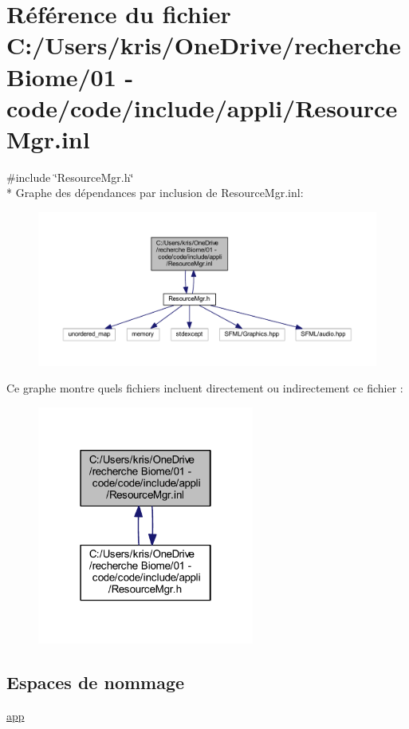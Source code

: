 \hypertarget{_resource_mgr_8inl}{}\section{Référence du fichier C\+:/\+Users/kris/\+One\+Drive/recherche Biome/01 -\/ code/code/include/appli/\+Resource\+Mgr.inl}
\label{_resource_mgr_8inl}
{\ttfamily \#include \char`\"{}Resource\+Mgr.\+h\char`\"{}}\\*
Graphe des dépendances par inclusion de Resource\+Mgr.\+inl\+:\nopagebreak
\begin{figure}[H]
\begin{center}
\leavevmode
\includegraphics[width=350pt]{_resource_mgr_8inl__incl}
\end{center}
\end{figure}
Ce graphe montre quels fichiers incluent directement ou indirectement ce fichier \+:\nopagebreak
\begin{figure}[H]
\begin{center}
\leavevmode
\includegraphics[width=202pt]{_resource_mgr_8inl__dep__incl}
\end{center}
\end{figure}
\subsection*{Espaces de nommage}
\begin{DoxyCompactItemize}
\item 
 \hyperlink{namespaceapp}{app}
\end{DoxyCompactItemize}
